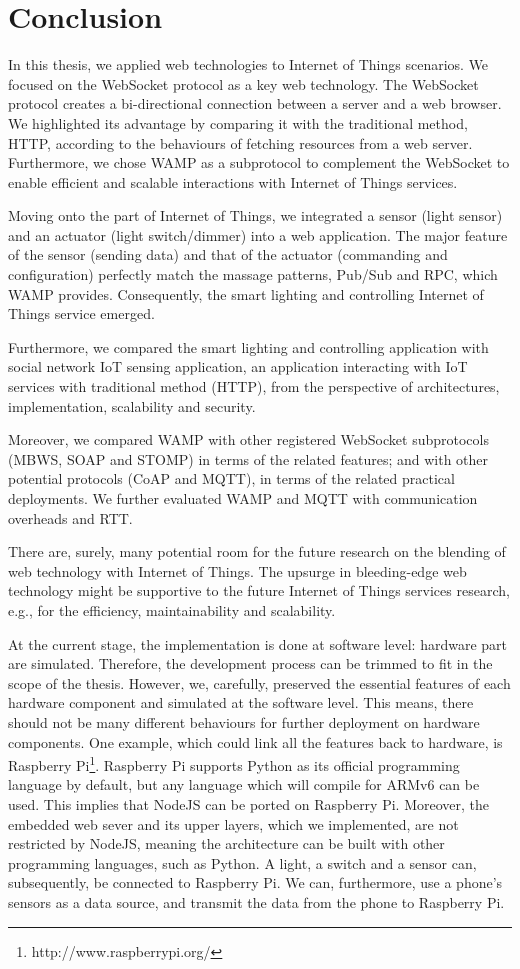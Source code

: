 \chapter{Conclusion}
\label{chapter:conclusion}

In this thesis, we applied web technologies to Internet of Things scenarios. We focused on the WebSocket protocol as a key web technology. The WebSocket protocol creates a bi-directional connection between a server and a web browser. We highlighted its advantage by comparing it with the traditional method, HTTP, according to the behaviours of fetching resources from a web server. Furthermore, we chose WAMP as a subprotocol to complement the WebSocket to enable efficient and scalable interactions with Internet of Things services. 

Moving onto the part of Internet of Things, we integrated a sensor (light sensor) and an actuator (light switch/dimmer) into a web application. The major feature of the sensor (sending data) and that of the actuator (commanding and configuration) perfectly match the massage patterns, Pub/Sub and RPC, which WAMP provides. Consequently, the smart lighting and controlling Internet of Things service emerged. 

Furthermore, we compared the smart lighting and controlling application with social network IoT sensing application, an application interacting with IoT services with traditional method (HTTP), from the perspective of architectures, implementation, scalability and security. 

Moreover, we compared WAMP with other registered WebSocket subprotocols (MBWS, SOAP and STOMP) in terms of the related features; and with other potential protocols (CoAP and MQTT), in terms of the related practical deployments. We further evaluated WAMP and MQTT with communication overheads and RTT. 

There are, surely, many potential room for the future research on the blending of web technology with Internet of Things. The upsurge in bleeding-edge web technology might be supportive to the future Internet of Things services research, e.g., for the efficiency, maintainability and scalability. 

At the current stage, the implementation is done at software level: hardware part are simulated. Therefore, the development process can be trimmed to fit in the scope of the thesis. However, we, carefully, preserved the essential features of each hardware component and simulated at the software level. This means, there should not be many different behaviours for further deployment on hardware components. One example, which could link all the features back to hardware, is Raspberry Pi\footnote{http://www.raspberrypi.org/}. Raspberry Pi supports Python as its official programming language by default, but any language which will compile for ARMv6 can be used. This implies that NodeJS can be ported on Raspberry Pi. Moreover, the embedded web sever and its upper layers, which we implemented, are not restricted by NodeJS, meaning the architecture can be built with other programming languages, such as Python. A light, a switch and a sensor can, subsequently, be connected to Raspberry Pi. We can, furthermore, use a phone's sensors as a data source, and transmit the data from the phone to Raspberry Pi. 